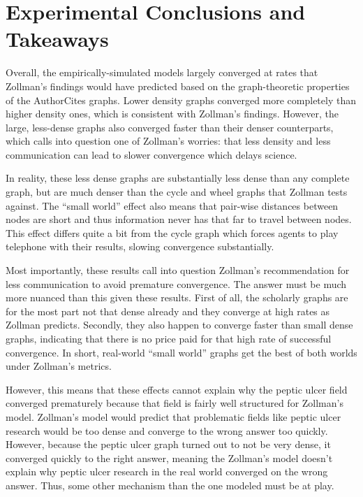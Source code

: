 \hypertarget{experimental-conclusions-and-takeaways}{%
\section{Experimental Conclusions and
Takeaways}\label{experimental-conclusions-and-takeaways}}

Overall, the empirically-simulated models largely converged at rates
that Zollman's findings would have predicted based on the
graph-theoretic properties of the AuthorCites graphs. Lower density
graphs converged more completely than higher density ones, which is
consistent with Zollman's findings. However, the large, less-dense
graphs also converged faster than their denser counterparts, which calls
into question one of Zollman's worries: that less density and less
communication can lead to slower convergence which delays science.

In reality, these less dense graphs are substantially less dense than
any complete graph, but are much denser than the cycle and wheel graphs
that Zollman tests against. The ``small world'' effect also means that
pair-wise distances between nodes are short and thus information never
has that far to travel between nodes. This effect differs quite a bit
from the cycle graph which forces agents to play telephone with their
results, slowing convergence substantially.

Most importantly, these results call into question Zollman's
recommendation for less communication to avoid premature convergence.
The answer must be much more nuanced than this given these results.
First of all, the scholarly graphs are for the most part not that dense
already and they converge at high rates as Zollman predicts. Secondly,
they also happen to converge faster than small dense graphs, indicating
that there is no price paid for that high rate of successful
convergence. In short, real-world ``small world'' graphs get the best of
both worlds under Zollman's metrics.

However, this means that these effects cannot explain why the peptic
ulcer field converged prematurely because that field is fairly well
structured for Zollman's model. Zollman's model would predict that
problematic fields like peptic ulcer research would be too dense and
converge to the wrong answer too quickly. However, because the peptic
ulcer graph turned out to not be very dense, it converged quickly to the
right answer, meaning the Zollman's model doesn't explain why peptic
ulcer research in the real world converged on the wrong answer. Thus,
some other mechanism than the one modeled must be at play.

